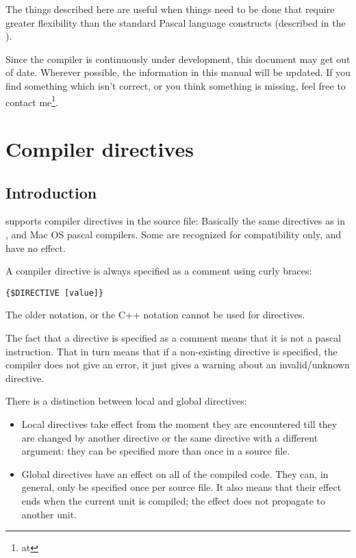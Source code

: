 The things described here are useful when things need to be done that
require greater flexibility than the standard Pascal language constructs
(described in the ).

Since the compiler is continuously under development, this document may get
out of date. Wherever possible, the information in this manual will be
updated. If you find something which isn't correct, or you think something
 is missing, feel free to contact me\footnote{at
}.

\chapter{Compiler directives}
\label{ch:CompSwitch}

\section{Introduction}
\fpc supports compiler directives in the source file: Basically the same
directives as in \tp, \delphi and Mac OS pascal compilers.
Some are recognized for compatibility only, and have no effect.

A compiler directive is always specified as a comment using curly braces:
\begin{verbatim}
{$DIRECTIVE [value]}
\end{verbatim}
The older \var{(* *)} notation, or the C++ notation \var{//} cannot be used
for directives.

The fact that a directive is specified as a comment means that it is not 
a pascal instruction. That in turn means that if a non-existing directive is
specified, the compiler does not give an error, it just gives a warning
about an invalid/unknown directive.

There is a distinction between local and global directives:
\begin{itemize}
\item Local directives take effect from the moment they are encountered till
they are changed by another directive or the same directive with a different
argument: they can be specified more than once in a source file.
\item Global directives have an effect on all of the compiled code. They
can, in general, only be specified once per source file. It also means that
their effect ends when the current unit is compiled; the effect does not 
propagate to another unit.
\end{itemize}


